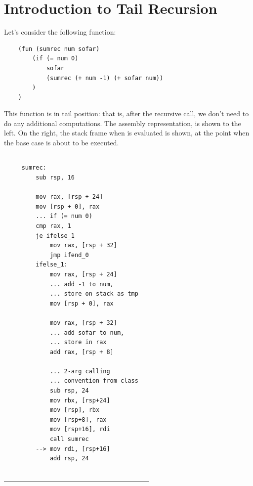 \documentclass[letterpaper]{article}
\begin{document}
\section{Introduction to Tail Recursion}
Let's consider the following function:
\begin{verbatim}
    (fun (sumrec num sofar)
        (if (= num 0)
            sofar 
            (sumrec (+ num -1) (+ sofar num))
        )
    )\end{verbatim}
This function is in tail position: that is, after the recursive call, we don't need to do any additional computations. The assembly representation, is shown to the left. On the right, the stack frame when  is evaluated is shown, at the point when the base case is about to be executed. 
\begin{center}
    \begin{tabular}{p{3in} p{3in}}
        \begin{verbatim}
    sumrec:
        sub rsp, 16
        
        mov rax, [rsp + 24]
        mov [rsp + 0], rax
        ... if (= num 0)  
        cmp rax, 1
        je ifelse_1
            mov rax, [rsp + 32]
            jmp ifend_0
        ifelse_1:
            mov rax, [rsp + 24]
            ... add -1 to num, 
            ... store on stack as tmp
            mov [rsp + 0], rax
    
            mov rax, [rsp + 32]
            ... add sofar to num, 
            ... store in rax
            add rax, [rsp + 8]
      
            ... 2-arg calling 
            ... convention from class
            sub rsp, 24
            mov rbx, [rsp+24]
            mov [rsp], rbx
            mov [rsp+8], rax
            mov [rsp+16], rdi
            call sumrec 
        --> mov rdi, [rsp+16]
            add rsp, 24 
        

\end{verbatim}
\end{tabular}
\end{center}
\end{document}
